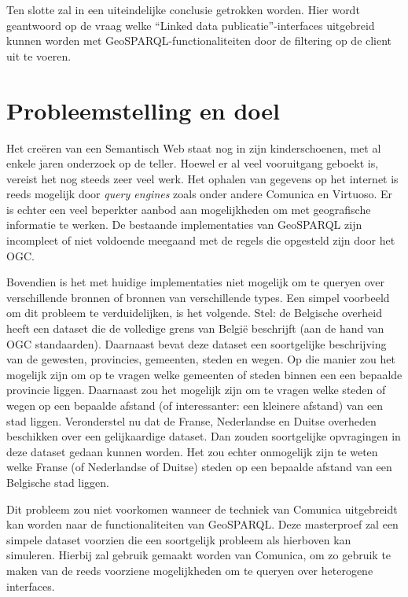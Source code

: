 Ten slotte zal in  een uiteindelijke conclusie getrokken worden. Hier wordt geantwoord op de vraag welke ``Linked data publicatie''-interfaces uitgebreid kunnen worden met GeoSPARQL-functionaliteiten door de filtering op de client uit te voeren.


\section{Probleemstelling en doel}
\label{sec:probleemstelling_doel}
Het creëren van een Semantisch Web staat nog in zijn kinderschoenen, met al enkele jaren onderzoek op de teller. Hoewel er al veel vooruitgang geboekt is, vereist het nog steeds zeer veel werk. Het ophalen van gegevens op het internet is reeds mogelijk door \textit{query engines} zoals onder andere Comunica en Virtuoso. Er is echter een veel beperkter aanbod aan mogelijkheden om met geografische informatie te werken. De bestaande implementaties van GeoSPARQL zijn incompleet of niet voldoende meegaand met de regels die opgesteld zijn door het OGC. 

Bovendien is het met huidige implementaties niet mogelijk om te queryen over verschillende bronnen of bronnen van verschillende types. Een simpel voorbeeld om dit probleem te verduidelijken, is het volgende. Stel: de Belgische overheid heeft een dataset die de volledige grens van België beschrijft (aan de hand van OGC standaarden). Daarnaast bevat deze dataset een soortgelijke beschrijving van de gewesten, provincies, gemeenten, steden en wegen. Op die manier zou het mogelijk zijn om op te vragen welke gemeenten of steden binnen een een bepaalde provincie liggen. Daarnaast zou het mogelijk zijn om te vragen welke steden of wegen op een bepaalde afstand (of interessanter: een kleinere afstand) van een stad liggen. Veronderstel nu dat de Franse, Nederlandse en Duitse overheden beschikken over een gelijkaardige dataset. Dan zouden soortgelijke opvragingen in deze dataset gedaan kunnen worden. Het zou echter onmogelijk zijn te weten welke Franse (of Nederlandse of Duitse) steden op een bepaalde afstand van een Belgische stad liggen. 

Dit probleem zou niet voorkomen wanneer de techniek van Comunica uitgebreidt kan worden naar de functionaliteiten van GeoSPARQL. Deze masterproef zal een simpele dataset voorzien die een soortgelijk probleem als hierboven kan simuleren. Hierbij zal gebruik gemaakt worden van Comunica, om zo gebruik te maken van de reeds voorziene mogelijkheden om te queryen over heterogene interfaces. 


